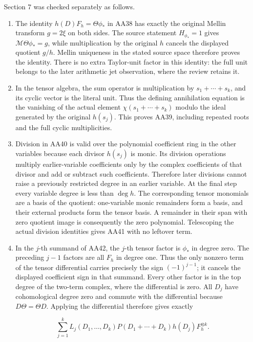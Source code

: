 \documentclass{article}
\begin{document}
Section 7 was checked separately as follows.

\begin{enumerate}
\def\labelenumi{\arabic{enumi}.}
\item
  The identity \(h(D)F_h=\Theta\phi_*\) in AA38 has exactly the original Mellin transform \(g=2\xi\) on both sides. The source statement \(H_{\phi_*}=1\) gives \(\mathcal M\Theta\phi_*=g\), while multiplication by the original \(h\) cancels the displayed quotient \(g/h\). Mellin uniqueness in the stated source space therefore proves the identity. There is no extra Taylor-unit factor in this identity: the full unit belongs to the later arithmetic jet observation, where the review retains it.
\item
  In the tensor algebra, the sum operator is multiplication by \(s_1+\cdots+s_k\), and its cyclic vector is the literal unit. Thus the defining annihilation equation is the vanishing of the actual element \(\chi(s_1+\cdots+s_k)\) modulo the ideal generated by the original \(h(s_j)\). This proves AA39, including repeated roots and the full cyclic multiplicities.
\item
  Division in AA40 is valid over the polynomial coefficient ring in the other variables because each divisor \(h(s_j)\) is monic. Its division operations multiply earlier-variable coefficients only by the complex coefficients of that divisor and add or subtract such coefficients. Therefore later divisions cannot raise a previously restricted degree in an earlier variable. At the final step every variable degree is less than \(\deg h\). The corresponding tensor monomials are a basis of the quotient: one-variable monic remainders form a basis, and their external products form the tensor basis. A remainder in their span with zero quotient image is consequently the zero polynomial. Telescoping the actual division identities gives AA41 with no leftover term.
\item
  In the \(j\)-th summand of AA42, the \(j\)-th tensor factor is \(\phi_*\) in degree zero. The preceding \(j-1\) factors are all \(F_h\) in degree one. Thus the only nonzero term of the tensor differential carries precisely the sign \((-1)^{j-1}\); it cancels the displayed coefficient sign in that summand. Every other factor is in the top degree of the two-term complex, where the differential is zero. All \(D_j\) have cohomological degree zero and commute with the differential because \(D\Theta=\Theta D\). Applying the differential therefore gives exactly

  \[
\sum_{j=1}^k L_j(D_1,\ldots,D_k)
P(D_1+\cdots+D_k)h(D_j)F_h^{\otimes k}.
\]


\end{enumerate}
\end{document}

